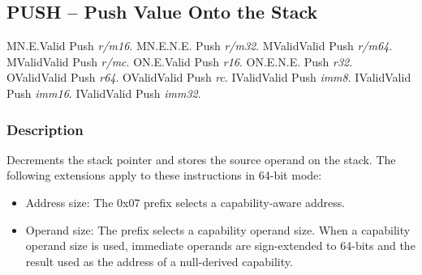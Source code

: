 \clearpage
{}
{}
\subsection*{PUSH -- Push Value Onto the Stack}

\begin{x86opcodetable}
  {M}{N.E.}{Valid}
  {Push \emph{r/m16}.}
  {M}{N.E.}{N.E.}
  {Push \emph{r/m32}.}
  {M}{Valid}{Valid}
  {Push \emph{r/m64}.}
  {M}{Valid}{Valid}
  {Push \emph{r/mc}.}
  {O}{N.E.}{Valid}
  {Push \emph{r16}.}
  {O}{N.E.}{N.E.}
  {Push \emph{r32}.}
  {O}{Valid}{Valid}
  {Push \emph{r64}.}
  {O}{Valid}{Valid}
  {Push \emph{rc}.}
  {I}{Valid}{Valid}
  {Push \emph{imm8}.}
  {I}{Valid}{Valid}
  {Push \emph{imm16}.}
  {I}{Valid}{Valid}
  {Push \emph{imm32}.}
\end{x86opcodetable}

\begin{x86opentable}
\end{x86opentable}

\subsubsection*{Description}

Decrements the stack pointer and stores the source operand on the
stack.  The following extensions apply to these instructions in 64-bit
mode:

\begin{itemize}
  \item Address size: The 0x07 prefix selects a capability-aware
    address.

  \item Operand size: The  prefix selects a capability
    operand size.  When a capability operand size is used, immediate
    operands are sign-extended to 64-bits and the result used as the
    address of a null-derived capability.
\end{itemize}

